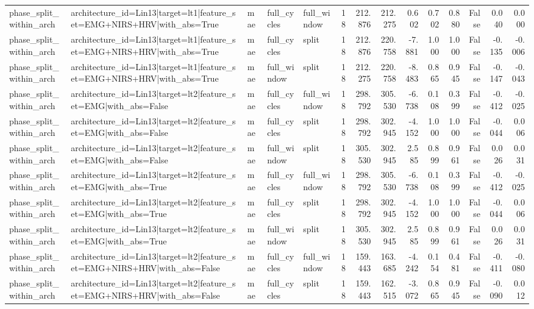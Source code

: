 \begin{table}
\begin{tabular}{lllllrrrrrrrrr}
phase_split_within_arch & architecture_id=Lin13|target=lt1|feature_set=EMG+NIRS+HRV|with_abs=True & mae & full_cycles & full_window & 18 & 212.876 & 212.275 & 0.602 & 0.702 & 0.880 & False & 0.040 & 0.000 \\
phase_split_within_arch & architecture_id=Lin13|target=lt1|feature_set=EMG+NIRS+HRV|with_abs=True & mae & full_cycles & split & 18 & 212.876 & 220.758 & -7.881 & 1.000 & 1.000 & False & -0.135 & -0.006 \\
phase_split_within_arch & architecture_id=Lin13|target=lt1|feature_set=EMG+NIRS+HRV|with_abs=True & mae & full_window & split & 18 & 212.275 & 220.758 & -8.483 & 0.865 & 0.945 & False & -0.147 & -0.043 \\
phase_split_within_arch & architecture_id=Lin13|target=lt2|feature_set=EMG|with_abs=False & mae & full_cycles & full_window & 18 & 298.792 & 305.530 & -6.738 & 0.108 & 0.399 & False & -0.412 & -0.025 \\
phase_split_within_arch & architecture_id=Lin13|target=lt2|feature_set=EMG|with_abs=False & mae & full_cycles & split & 18 & 298.792 & 302.945 & -4.152 & 1.000 & 1.000 & False & -0.044 & 0.006 \\
phase_split_within_arch & architecture_id=Lin13|target=lt2|feature_set=EMG|with_abs=False & mae & full_window & split & 18 & 305.530 & 302.945 & 2.585 & 0.899 & 0.961 & False & 0.026 & 0.031 \\
phase_split_within_arch & architecture_id=Lin13|target=lt2|feature_set=EMG|with_abs=True & mae & full_cycles & full_window & 18 & 298.792 & 305.530 & -6.738 & 0.108 & 0.399 & False & -0.412 & -0.025 \\
phase_split_within_arch & architecture_id=Lin13|target=lt2|feature_set=EMG|with_abs=True & mae & full_cycles & split & 18 & 298.792 & 302.945 & -4.152 & 1.000 & 1.000 & False & -0.044 & 0.006 \\
phase_split_within_arch & architecture_id=Lin13|target=lt2|feature_set=EMG|with_abs=True & mae & full_window & split & 18 & 305.530 & 302.945 & 2.585 & 0.899 & 0.961 & False & 0.026 & 0.031 \\
phase_split_within_arch & architecture_id=Lin13|target=lt2|feature_set=EMG+NIRS+HRV|with_abs=False & mae & full_cycles & full_window & 18 & 159.443 & 163.685 & -4.242 & 0.154 & 0.481 & False & -0.411 & -0.080 \\
phase_split_within_arch & architecture_id=Lin13|target=lt2|feature_set=EMG+NIRS+HRV|with_abs=False & mae & full_cycles & split & 18 & 159.443 & 162.515 & -3.072 & 0.865 & 0.945 & False & -0.090 & 0.012 \\

\end{tabular}
\end{table}
